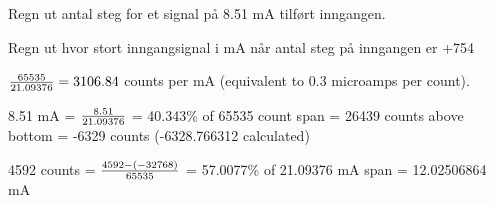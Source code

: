 \vskip 10pt

Regn ut antal steg for et signal på 8.51 mA tilført inngangen. 


\vskip 10pt


Regn ut hvor stort inngangsignal i mA når antal steg på inngangen er +754







\vskip 10pt









\vskip 10pt


\vskip 10pt

${65535 \over 21.09376}= 3106.84$ counts per mA (equivalent to 0.3 microamps per count).

\vskip 10pt

8.51 mA = ${8.51 \over 21.09376}$ = 40.343\% of 65535 count span = 26439 counts above bottom = -6329 counts (-6328.766312 calculated)

\vskip 10pt

4592 counts = ${4592 - (-32768) \over 65535}$ = 57.0077\% of 21.09376 mA span = 12.02506864 mA



